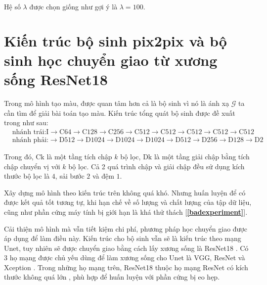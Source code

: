\documentclass[a4paper, 12pt]{report}
\begin{document}
Hệ số $\lambda$ được chọn giống như \cite{isola2018imagetoimage} gợi ý là $\lambda = 100$.\vspace{5pt}

\section{Kiến trúc bộ sinh pix2pix và bộ sinh học chuyển giao từ xương sống ResNet18}\label{transferlearning}

Trong mô hình tạo màu, được quan tâm hơn cả là bộ sinh vì nó là ánh xạ $\mathcal{G}$ ta cần tìm để giải bài toán tạo màu.
Kiến trúc tổng quát bộ sinh được đề xuất trong \cite{isola2018imagetoimage} như sau:
\begin{align}
    &\text{nhánh trái:} \text{I} \rightarrow \text{C64} \rightarrow \text{C128} \rightarrow \text{C256} \rightarrow \text{C512} \rightarrow \text{C512} \rightarrow \text{C512} \rightarrow \text{C512} \rightarrow \text{C512}\\
    &\text{nhánh phải:} \rightarrow \text{D512} \rightarrow \text{D1024} \rightarrow \text{D1024} \rightarrow \text{D1024} \rightarrow \text{D512} \rightarrow \text{D256} \rightarrow \text{D128} \rightarrow \text{D2}
\end{align}

Trong đó, $\text{Ck}$ là một tầng tích chập $k$ bộ lọc, $\text{Dk}$ là một tầng giải chập bằng tích chập chuyển vị với $k$ bộ lọc.
Cả 2 quá trình chập và giải chập đều sử dụng kích thước bộ lọc là $4$, sải bước $2$ và đệm $1$.\vspace{5pt}

Xây dựng mô hình theo kiến trúc trên không quá khó.
Nhưng huấn luyện để có được kết quả tốt tương tự, khi hạn chế về số lượng và chất lượng của tập dữ liệu, cũng như phần cứng máy tính bị giới hạn là khá thử thách [\textbf{\ref{badexperiment}}].\vspace{5pt}

Cải thiện mô hình mà vẫn tiết kiệm chi phí, phương pháp học chuyển giao được áp dụng để làm điều này.
Kiến trúc cho bộ sinh vẫn sẽ là kiến trúc theo mạng Unet, tuy nhiên sẽ được chuyển giao bằng cách lấy xương sống là ResNet18 \cite{christopherresunet2019}.
Có 3 họ mạng được chủ yếu dùng để làm xương sống cho Unet là VGG, ResNet và Xception \cite{backboneresnet2020}.
Trong những họ mạng trên, ResNet18 thuộc họ mạng ResNet có kích thước không quá lớn \cite{Khan_2020}, phù hợp để huấn luyện với phần cứng bị eo hẹp.
\end{document}
